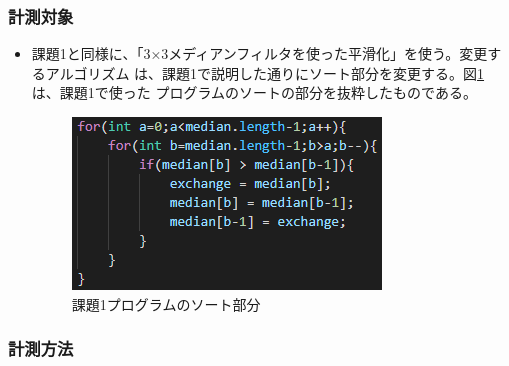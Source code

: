 \subsubsection{計測対象}
\begin{itemize}
  \item 課題1と同様に、「3×3メディアンフィルタを使った平滑化」を使う。変更するアルゴリズム
  は、課題1で説明した通りにソート部分を変更する。図\ref{graph:10}は、課題1で使った
  プログラムのソートの部分を抜粋したものである。
  \begin{figure}[htbp]
    \begin{minipage}[t]{\hsize}
      \centering
      \caption{課題1プログラムのソート部分}
      \label{graph:10}
      \includegraphics[scale=1]{課題2バブルソート.PNG}
    \end{minipage}
  \end{figure}

\end{itemize}

\subsubsection{計測方法}